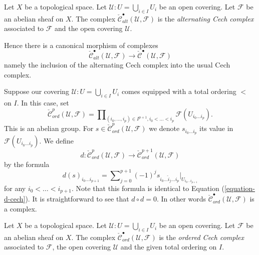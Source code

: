\begin{definition}
\label{definition-alternating-cech-complex}
Let $X$ be a topological space. Let $\mathcal{U} : U = \bigcup_{i \in I} U_i$
be an open covering. Let $\mathcal{F}$ be an abelian sheaf on $X$.
The complex $\check{\mathcal{C}}_{alt}^\bullet(\mathcal{U}, \mathcal{F})$
is the {\it alternating Cech complex} associated to $\mathcal{F}$ and the
open covering $\mathcal{U}$.
\end{definition}

\noindent
Hence there is a canonical morphism of complexes
$$
\check{\mathcal{C}}_{alt}^\bullet(\mathcal{U}, \mathcal{F})
\longrightarrow
\check{\mathcal{C}}^\bullet(\mathcal{U}, \mathcal{F})
$$
namely the inclusion of the alternating Cech complex into the
usual Cech complex.

\medskip\noindent
Suppose our covering $\mathcal{U} : U = \bigcup_{i \in I} U_i$ comes
equipped with a total ordering $<$ on $I$. In this case, set
$$
\check{\mathcal{C}}_{ord}^p(\mathcal{U}, \mathcal{F})
=
\prod\nolimits_{(i_0, \ldots, i_p) \in I^{p + 1}, i_0 < \ldots < i_p}
\mathcal{F}(U_{i_0\ldots i_p}).
$$
This is an abelian group. For
$s \in \check{\mathcal{C}}_{ord}^p(\mathcal{U}, \mathcal{F})$ we denote
$s_{i_0\ldots i_p}$ its value in $\mathcal{F}(U_{i_0\ldots i_p})$.
We define
$$
d : \check{\mathcal{C}}_{ord}^p(\mathcal{U}, \mathcal{F})
\longrightarrow
\check{\mathcal{C}}_{ord}^{p + 1}(\mathcal{U}, \mathcal{F})
$$
by the formula
$$
d(s)_{i_0\ldots i_{p + 1}}
=
\sum\nolimits_{j = 0}^{p + 1}
(-1)^j
s_{i_0\ldots \hat i_j \ldots i_p}|_{U_{i_0\ldots i_{p + 1}}}
$$
for any $i_0 < \ldots < i_{p + 1}$. Note that this formula is identical
to Equation (\ref{equation-d-cech}).
It is straightforward to see that $d \circ d = 0$. In other words
$\check{\mathcal{C}}_{ord}^\bullet(\mathcal{U}, \mathcal{F})$ is a complex.

\begin{definition}
\label{definition-ordered-cech-complex}
Let $X$ be a topological space.
Let $\mathcal{U} : U = \bigcup_{i \in I} U_i$ be an open covering.
Let $\mathcal{F}$ be an abelian sheaf on $X$.
The complex $\check{\mathcal{C}}_{ord}^\bullet(\mathcal{U}, \mathcal{F})$
is the {\it ordered Cech complex} associated to $\mathcal{F}$, the
open covering $\mathcal{U}$ and the given total ordering on $I$.
\end{definition}

